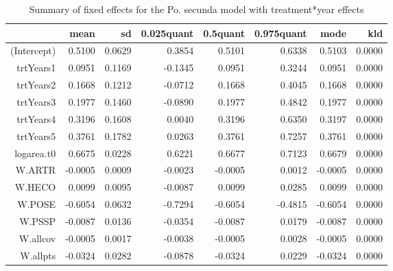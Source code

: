 \begin{table}[ht]
\centering
\caption{Summary of fixed effects for the Po. secunda model with treatment*year effects} 
\label{POSEgrowth-trtYears}
\begin{tabular}{rrrrrrrr}
  \hline
 & mean & sd & 0.025quant & 0.5quant & 0.975quant & mode & kld \\ 
  \hline
(Intercept) & 0.5100 & 0.0629 & 0.3854 & 0.5101 & 0.6338 & 0.5103 & 0.0000 \\ 
  trtYears1 & 0.0951 & 0.1169 & -0.1345 & 0.0951 & 0.3244 & 0.0951 & 0.0000 \\ 
  trtYears2 & 0.1668 & 0.1212 & -0.0712 & 0.1668 & 0.4045 & 0.1668 & 0.0000 \\ 
  trtYears3 & 0.1977 & 0.1460 & -0.0890 & 0.1977 & 0.4842 & 0.1977 & 0.0000 \\ 
  trtYears4 & 0.3196 & 0.1608 & 0.0040 & 0.3196 & 0.6350 & 0.3197 & 0.0000 \\ 
  trtYears5 & 0.3761 & 0.1782 & 0.0263 & 0.3761 & 0.7257 & 0.3761 & 0.0000 \\ 
  logarea.t0 & 0.6675 & 0.0228 & 0.6221 & 0.6677 & 0.7123 & 0.6679 & 0.0000 \\ 
  W.ARTR & -0.0005 & 0.0009 & -0.0023 & -0.0005 & 0.0012 & -0.0005 & 0.0000 \\ 
  W.HECO & 0.0099 & 0.0095 & -0.0087 & 0.0099 & 0.0285 & 0.0099 & 0.0000 \\ 
  W.POSE & -0.6054 & 0.0632 & -0.7294 & -0.6054 & -0.4815 & -0.6054 & 0.0000 \\ 
  W.PSSP & -0.0087 & 0.0136 & -0.0354 & -0.0087 & 0.0179 & -0.0087 & 0.0000 \\ 
  W.allcov & -0.0005 & 0.0017 & -0.0038 & -0.0005 & 0.0028 & -0.0005 & 0.0000 \\ 
  W.allpts & -0.0324 & 0.0282 & -0.0878 & -0.0324 & 0.0229 & -0.0324 & 0.0000 \\ 
   \hline
\end{tabular}
\end{table}

